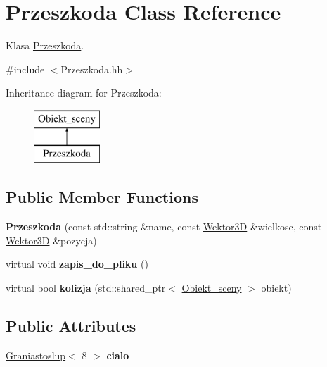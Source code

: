 \hypertarget{class_przeszkoda}{}\section{Przeszkoda Class Reference}
\label{class_przeszkoda}


Klasa \mbox{\hyperlink{class_przeszkoda}{Przeszkoda}}.  




{\ttfamily \#include $<$Przeszkoda.\+hh$>$}

Inheritance diagram for Przeszkoda\+:\begin{figure}[H]
\begin{center}
\leavevmode
\includegraphics[height=2.000000cm]{class_przeszkoda}
\end{center}
\end{figure}
\subsection*{Public Member Functions}
\begin{DoxyCompactItemize}
\item 
\mbox{\label{class_przeszkoda_a8bb73b085be55d7f1c2420384180d043}} 
{\bfseries Przeszkoda} (const std\+::string \&name, const \mbox{\hyperlink{class_wektor}{Wektor3D}} \&wielkosc, const \mbox{\hyperlink{class_wektor}{Wektor3D}} \&pozycja)
\item 
\mbox{\label{class_przeszkoda_a3b99c29bb23f7d1001f3ba5afbb3e611}} 
virtual void {\bfseries zapis\+\_\+do\+\_\+pliku} ()
\item 
\mbox{\label{class_przeszkoda_a19f539bb10e35b7f031f24a8c6cfeaf0}} 
virtual bool {\bfseries kolizja} (std\+::shared\+\_\+ptr$<$ \mbox{\hyperlink{class_obiekt__sceny}{Obiekt\+\_\+sceny}} $>$ obiekt)
\end{DoxyCompactItemize}
\subsection*{Public Attributes}
\begin{DoxyCompactItemize}
\item 
\mbox{\label{class_przeszkoda_a619757115cc59e7a8de9e607b847c0d4}} 
\mbox{\hyperlink{class_graniastoslup}{Graniastoslup}}$<$ 8 $>$ {\bfseries cialo}
\end{DoxyCompactItemize}
